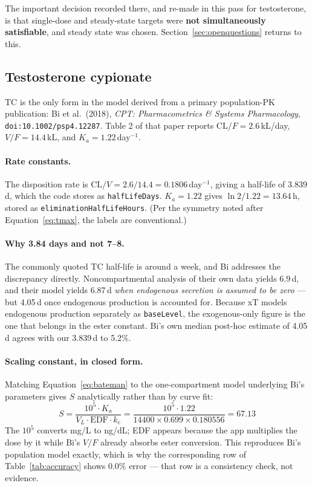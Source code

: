 \documentclass[11pt,a4paper]{article}
\newcommand{\code}[1]{\texttt{\small #1}}
\begin{document}
The important decision recorded there, and re-made in this pass for testosterone,
is that single-dose and steady-state targets were \textbf{not simultaneously
satisfiable}, and steady state was chosen. Section~\ref{sec:openquestions}
returns to this.

\subsection{Testosterone cypionate}
\label{sec:tc}

TC is the only form in the model derived from a primary population-PK
publication: Bi et al.\ (2018), \emph{CPT: Pharmacometrics \& Systems
Pharmacology}, \texttt{doi:10.1002/psp4.12287}. Table 2 of that paper reports
$\mathrm{CL}/F = 2.6$\,kL/day, $V/F = 14.4$\,kL, and $K_a = 1.22$\,day$^{-1}$.

\paragraph{Rate constants.} The disposition rate is
$\mathrm{CL}/V = 2.6/14.4 = 0.1806$\,day$^{-1}$, giving a half-life of 3.839\,d,
which the code stores as \code{halfLifeDays}. $K_a = 1.22$ gives
$\ln 2 / 1.22 = 13.64$\,h, stored as \code{eliminationHalfLifeHours}. (Per the
symmetry noted after Equation~\ref{eq:tmax}, the labels are conventional.)

\paragraph{Why 3.84 days and not 7--8.} The commonly quoted TC half-life is
around a week, and Bi addresses the discrepancy directly. Noncompartmental
analysis of their own data yields 6.9\,d, and their model yields 6.87\,d
\emph{when endogenous secretion is assumed to be zero} --- but 4.05\,d once
endogenous production is accounted for. Because xT models endogenous production
separately as \code{baseLevel}, the exogenous-only figure is the one that belongs
in the ester constant. Bi's own median post-hoc estimate of 4.05\,d agrees with
our 3.839\,d to 5.2\%.

\paragraph{Scaling constant, in closed form.} Matching Equation~\ref{eq:bateman}
to the one-compartment model underlying Bi's parameters gives $S$ analytically
rather than by curve fit:
\begin{equation}
S = \frac{10^5 \cdot K_a}{V_L \cdot \mathrm{EDF} \cdot k_e}
  = \frac{10^5 \cdot 1.22}{14400 \times 0.699 \times 0.180556} = 67.13
\label{eq:tcS}
\end{equation}
The $10^5$ converts mg/L to ng/dL; EDF appears because the app multiplies the dose
by it while Bi's $V/F$ already absorbs ester conversion. This reproduces Bi's
population model exactly, which is why the corresponding row of
Table~\ref{tab:accuracy} shows 0.0\% error --- that row is a consistency check,
not evidence.
\end{document}
